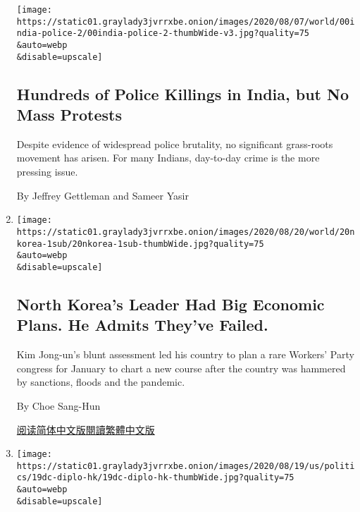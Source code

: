 \begin{enumerate}
  \texttt{[image: https://static01.graylady3jvrrxbe.onion/images/2020/08/07/world/00india-police-2/00india-police-2-thumbWide-v3.jpg?quality=75\\\&auto=webp\\\&disable=upscale]}

  \hypertarget{hundreds-of-police-killings-in-india-but-no-mass-protests}{%
  \subsection{Hundreds of Police Killings in India, but No Mass
  Protests}\label{hundreds-of-police-killings-in-india-but-no-mass-protests}}

  Despite evidence of widespread police brutality, no significant
  grass-roots movement has arisen. For many Indians, day-to-day crime is
  the more pressing issue.

  By Jeffrey Gettleman and Sameer Yasir
\item
  \href{/2020/08/19/world/asia/north-korea-economy-coronavirus.html}{}

  \texttt{[image: https://static01.graylady3jvrrxbe.onion/images/2020/08/20/world/20nkorea-1sub/20nkorea-1sub-thumbWide.jpg?quality=75\\\&auto=webp\\\&disable=upscale]}

  \hypertarget{north-koreas-leader-had-big-economic-plans-he-admits-theyve-failed}{%
  \subsection{North Korea's Leader Had Big Economic Plans. He Admits
  They've
  Failed.}\label{north-koreas-leader-had-big-economic-plans-he-admits-theyve-failed}}

  Kim Jong-un's blunt assessment led his country to plan a rare Workers'
  Party congress for January to chart a new course after the country was
  hammered by sanctions, floods and the pandemic.

  By Choe Sang-Hun

  \href{https://cn.nytimes3xbfgragh.onion/asia-pacific/20200821/north-korea-economy-coronavirus/}{阅读简体中文版}\href{https://cn.nytimes3xbfgragh.onion/asia-pacific/20200821/north-korea-economy-coronavirus/zh-hant/}{閱讀繁體中文版}
\item
  \href{/2020/08/19/us/politics/trump-china-hong-kong.html}{}

  \texttt{[image: https://static01.graylady3jvrrxbe.onion/images/2020/08/19/us/politics/19dc-diplo-hk/19dc-diplo-hk-thumbWide.jpg?quality=75\\\&auto=webp\\\&disable=upscale]}

  \hypertarget{us-suspends-bilateral-agreements-with-hong-kong-escalating-tensions-with-china}{%
}
\end{enumerate}

